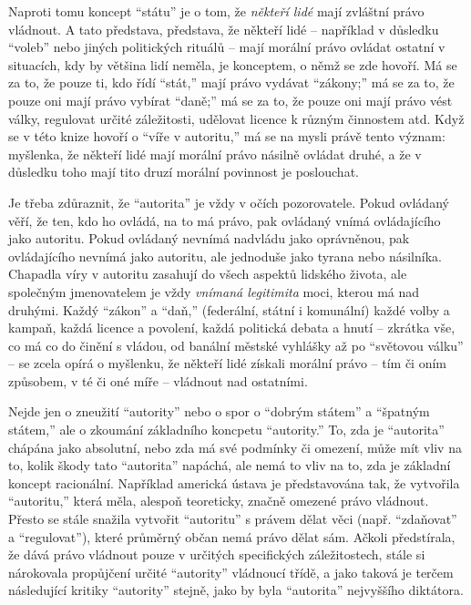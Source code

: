 \documentclass{book}
\begin{document}
Naproti tomu koncept \enquote{státu} je o tom, že \emph{někteří lidé} mají zvláštní právo vládnout. A tato představa, představa, že někteří lidé -- například v důsledku \enquote{voleb} nebo jiných politických rituálů -- mají morální právo ovládat ostatní v situacích, kdy by většina lidí neměla, je konceptem, o němž se zde hovoří. Má se za to, že pouze ti, kdo řídí \enquote{stát,} mají právo vydávat \enquote{zákony;} má se za to, že pouze oni mají právo vybírat \enquote{daně;} má se za to, že pouze oni mají právo vést války, regulovat určité záležitosti, udělovat licence k různým činnostem atd. Když se v této knize hovoří o \enquote{víře v autoritu,} má se na mysli právě tento význam: myšlenka, že někteří lidé mají morální právo násilně ovládat druhé, a že v důsledku toho mají tito druzí morální povinnost je poslouchat.

Je třeba zdůraznit, že \enquote{autorita} je vždy v očích pozorovatele. Pokud ovládaný věří, že ten, kdo ho ovládá, na to má právo, pak ovládaný vnímá ovládajícího jako autoritu. Pokud ovládaný nevnímá nadvládu jako oprávněnou, pak ovládajícího nevnímá jako autoritu, ale jednoduše jako tyrana nebo násilníka. Chapadla víry v autoritu zasahují do všech aspektů lidského života, ale společným jmenovatelem je vždy \emph{vnímaná legitimita} moci, kterou má nad druhými. Každý \enquote{zákon} a \enquote{daň,} (federální, státní i komunální) každé volby a kampaň, každá licence a povolení, každá politická debata a hnutí -- zkrátka vše, co má co do činění s vládou, od banální městské vyhlášky až po \enquote{světovou válku} -- se zcela opírá o myšlenku, že někteří lidé získali morální právo -- tím či oním způsobem, v té či oné míře -- vládnout nad ostatními.

Nejde jen o zneužití \enquote{autority} nebo o spor o \enquote{dobrým státem} a \enquote{špatným státem,} ale o zkoumání základního koncpetu \enquote{autority.} To, zda je \enquote{autorita} chápána jako absolutní, nebo zda má své podmínky či omezení, může mít vliv na to, kolik škody tato \enquote{autorita} napáchá, ale nemá to vliv na to, zda je základní koncept racionální. Například americká ústava je představována tak, že vytvořila \enquote{autoritu,} která měla, alespoň teoreticky, značně omezené právo vládnout. Přesto se stále snažila vytvořit \enquote{autoritu} s právem dělat věci (např. \enquote{zdaňovat} a \enquote{regulovat}), které průměrný občan nemá právo dělat sám. Ačkoli předstírala, že dává právo vládnout pouze v určitých specifických záležitostech, stále si nárokovala propůjčení určité \enquote{autority} vládnoucí třídě, a jako taková je terčem následující kritiky \enquote{autority} stejně, jako by byla \enquote{autorita} nejvyššího diktátora.
\end{document}
